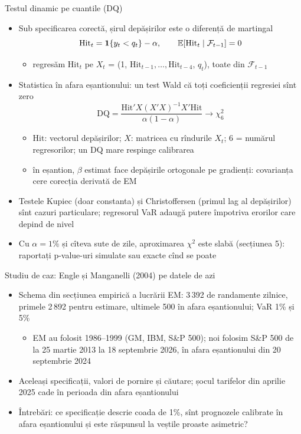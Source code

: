 \begin{frame}{Testul dinamic pe cuantile (DQ)}
\itemsize{\footnotesize}
\begin{itemize}
    \item Sub specificarea corectă, șirul depășirilor este o diferență de martingal
    \[ \mathrm{Hit}_t = \mathbf 1\{y_t < q_t\} - \alpha, \qquad \mathbb{E}[\mathrm{Hit}_t \mid \mathcal F_{t-1}] = 0 \]
    \begin{itemize}
        \item regresăm $\mathrm{Hit}_t$ pe $X_t$ = (1, $\mathrm{Hit}_{t-1}, \dots, \mathrm{Hit}_{t-4}$, $q_t$), toate din $\mathcal F_{t-1}$ 
    \end{itemize}
    \item Statistica în afara eșantionului: un test Wald că toți coeficienții regresiei sînt zero
    \[ \mathrm{DQ} = \frac{\mathrm{Hit}'X(X'X)^{-1}X'\mathrm{Hit}}{\alpha(1 - \alpha)} \to \chi^2_6 \]
    \begin{itemize}
        \item $\mathrm{Hit}$: vectorul depășirilor; $X$: matricea cu rîndurile $X_t$; 6 = numărul regresorilor; un DQ mare respinge calibrarea
        \item în eșantion, $\beta$ estimat face depășirile ortogonale pe gradienți: covarianța cere corecția derivată de EM
    \end{itemize}
    \item Testele Kupiec (doar constanta) și Christoffersen (primul lag al depășirilor) sînt cazuri particulare; regresorul VaR adaugă putere împotriva erorilor care depind de nivel
    \item Cu $\alpha = 1\%$ și cîteva sute de zile, aproximarea $\chi^2$ este slabă (secțiunea 5): raportați p-value-uri simulate sau exacte cînd se poate
\end{itemize}
\end{frame}

\begin{frame}{Studiu de caz: Engle și Manganelli (2004) pe datele de azi}
\itemsize{\small}
\begin{itemize}
    \item Schema din secțiunea empirică a lucrării EM: 3\,392 de randamente zilnice, primele 2\,892 pentru estimare, ultimele 500 în afara eșantionului; VaR 1\% și 5\%
    \begin{itemize}
        \item EM au folosit 1986--1999 (GM, IBM, S\&P 500); noi folosim S\&P 500 de la 25 martie 2013 la 18 septembrie 2026, în afara eșantionului din 20 septembrie 2024
    \end{itemize}
    \item Aceleași specificații, valori de pornire și căutare; șocul tarifelor din aprilie 2025 cade în perioada din afara eșantionului
    \item Întrebări: ce specificație descrie coada de 1\%, sînt prognozele calibrate în afara eșantionului și este răspunsul la veștile proaste asimetric?
\end{itemize}
\end{frame}

